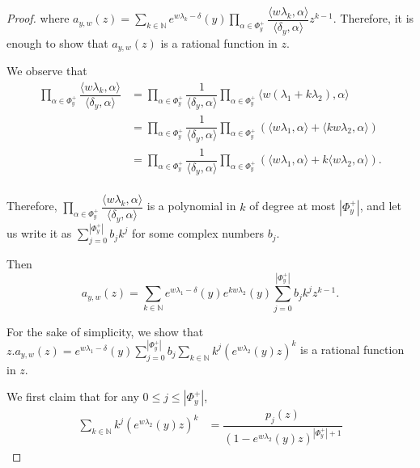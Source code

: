 \documentclass[10pt,a4paper]{amsart}
\newcommand{\N}{{\mathbb N}}
\begin{document}
\begin{proof}
\noindent where $a_{y,w} (z) = \sum\limits_{k \in \N} e ^{w \lambda_k -\delta }(y) \prod\limits_{\alpha \in \Phi_y^+} \dfrac{\langle w \lambda_k , \alpha \rangle }{\langle \delta_y , \alpha \rangle} z^{k-1}$. 
 Therefore, it is enough to show that $a_{y,w}(z)$ is a rational function in $z$. 
 
\noindent We observe that
 \begin{equation}
 \begin{split}
 \prod\limits_{\alpha \in \Phi_y^+} \dfrac{\langle w \lambda_k , \alpha \rangle }{ \langle \delta_y, \alpha \rangle }
 & = \prod\limits_{\alpha \in \Phi_y^+} \dfrac{1}{\langle \delta_y, \alpha \rangle } \prod\limits_{\alpha \in \Phi_y^+} \langle w (\lambda_1 + k \lambda_2 ) , \alpha \rangle \\
 & = \prod\limits_{\alpha \in \Phi_y^+} \dfrac{1}{\langle \delta_y, \alpha \rangle} \prod\limits_{\alpha \in \Phi_y^+} ( \langle w \lambda_1, \alpha \rangle + \langle k w \lambda_2, \alpha \rangle )\\
 & = \prod\limits_{\alpha \in \Phi_y^+} \dfrac{1}{\langle \delta_y, \alpha \rangle} \prod\limits_{\alpha \in \Phi_y^+}( \langle w \lambda_1 , \alpha \rangle + k \langle w \lambda_2, \alpha \rangle ).\\
\end{split}
\end{equation} 

\noindent Therefore, $\prod\limits_{\alpha \in \Phi_y^+} \dfrac{\langle w \lambda_k , \alpha \rangle }{\langle \delta_y , \alpha \rangle}$ is a polynomial in $k$ of degree at most $|\Phi_y^+|$, and let us write it as $\sum\limits_{j=0}^{|\Phi_y^+|} b_j k^j$ for some complex numbers $b_j$. 


\noindent Then $$a_{y,w}(z)=\sum\limits_{k \in \N} e^{w \lambda_1 - \delta}(y) e^{k w \lambda_2} (y) \sum\limits_{j=0}^{|\Phi_y^+|} b_j k^j z^{k-1}.$$


\noindent For the sake of simplicity, we show that $z . a_{y,w}(z)= e^{w \lambda_1-\delta}(y) \sum\limits_{j=0}^{|\Phi_y^+|} b_j \sum\limits_{k \in \N} k ^j (e^{w \lambda_2}(y) z )^k$ is a rational function in $z$.

\noindent We first claim that for any $0 \leq j \leq |\Phi_y^+|$, 
\vspace{2pt}
\begin{equation}\label{claim}
\begin{split}
\sum\limits_{k \in \N} k^j (e ^{w \lambda_2}(y) z )^k 
& = \dfrac{p_j(z)}{(1-e^{w \lambda_2}(y)z)^{|\Phi_y^+| +1}}
\end{split}
\end{equation}


\end{proof}
\end{document}
